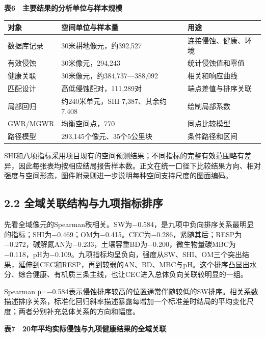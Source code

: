 \documentclass[
  11pt,
  a4paper,
]{ctexart}
\begin{document}
\textbf{表6　主要结果的分析单位与样本规模}

\begin{longtable}[]{@{}lll@{}}
\toprule
对象 & 空间单位与样本量 & 用途 \\
\midrule
\endhead
数据库记录 & 30米耕地像元，约392,527 & 连接侵蚀、健康、环境 \\
有效侵蚀 & 30米像元，294,243 & 统计侵蚀值和零值 \\
健康关联 & 30米像元，约384,737---388,092 & 相关和响应曲线 \\
匹配设计 & 高低侵蚀配对，111,289对 & 端点差值与排序关联 \\
局部回归 & 约240米单元，SHI 7,387、其余约7,408 & 绘制局部系数 \\
GWR/MGWR & 均衡空间点，770 & 同点比较模型 \\
路径模型 & 293,145个像元、35个5公里块 & 条件路径和区间 \\
\bottomrule
\end{longtable}

SHI和八项指标采用项目现有的空间预测结果；不同指标的完整有效范围略有差异，因此每张表均按相应结局报告样本数。正文在统一口径下比较结果方向、相对强度与空间形态，图件附录则进一步说明每种空间支持尺度的图面编码。

\hypertarget{ux5168ux57dfux5173ux8054ux7ed3ux6784ux4e0eux4e5dux9879ux6307ux6807ux6392ux5e8f}{%
\subsection{2.2
全域关联结构与九项指标排序}\label{ux5168ux57dfux5173ux8054ux7ed3ux6784ux4e0eux4e5dux9879ux6307ux6807ux6392ux5e8f}}

先看全域像元的Spearman秩相关。SW为−0.584，是九项中负向排序关系最明显的指标；SHI为−0.469；OM为−0.415。CEC为−0.286，紧随其后；RESP为−0.272，碱解氮AN为−0.233，土壤容重BD为−0.200，微生物量碳MBC为−0.118，pH为−0.109。九项指标均呈负向，强度从SW、SHI、OM三个突出结果，延伸到CEC和RESP，再到较弱的AN、BD、MBC与pH。这个排序凸显出水分、综合健康、有机质三条主线，也让CEC进入总体负向关联较明显的一组。

Spearman
ρ=−0.584表示侵蚀排序较高的位置通常伴随较低的SW排序。相关系数描述排序关系，标准化回归斜率描述暴露每增加一个标准差时结局的平均变化尺度；两者分别补充总体关系的方向和幅度。

\textbf{表7　20年平均实际侵蚀与九项健康结果的全域关联}
\end{document}
